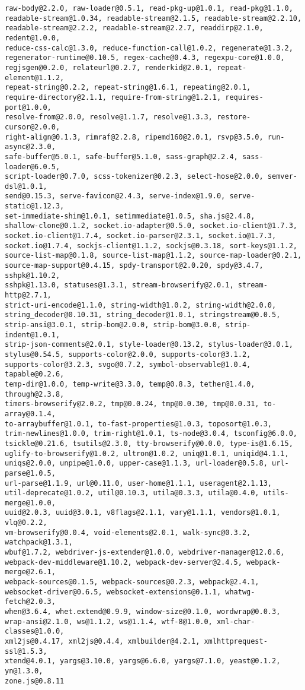 \documentclass[a4paper]{article}
\begin{document}
\begin{verbatim}
raw-body@2.2.0, raw-loader@0.5.1, read-pkg-up@1.0.1, read-pkg@1.1.0,
readable-stream@1.0.34, readable-stream@2.1.5, readable-stream@2.2.10,
readable-stream@2.2.2, readable-stream@2.2.7, readdirp@2.1.0, redent@1.0.0,
reduce-css-calc@1.3.0, reduce-function-call@1.0.2, regenerate@1.3.2,
regenerator-runtime@0.10.5, regex-cache@0.4.3, regexpu-core@1.0.0,
regjsgen@0.2.0, relateurl@0.2.7, renderkid@2.0.1, repeat-element@1.1.2,
repeat-string@0.2.2, repeat-string@1.6.1, repeating@2.0.1,
require-directory@2.1.1, require-from-string@1.2.1, requires-port@1.0.0,
resolve-from@2.0.0, resolve@1.1.7, resolve@1.3.3, restore-cursor@2.0.0,
right-align@0.1.3, rimraf@2.2.8, ripemd160@2.0.1, rsvp@3.5.0, run-async@2.3.0,
safe-buffer@5.0.1, safe-buffer@5.1.0, sass-graph@2.2.4, sass-loader@6.0.5,
script-loader@0.7.0, scss-tokenizer@0.2.3, select-hose@2.0.0, semver-dsl@1.0.1,
send@0.15.3, serve-favicon@2.4.3, serve-index@1.9.0, serve-static@1.12.3,
set-immediate-shim@1.0.1, setimmediate@1.0.5, sha.js@2.4.8,
shallow-clone@0.1.2, socket.io-adapter@0.5.0, socket.io-client@1.7.3,
socket.io-client@1.7.4, socket.io-parser@2.3.1, socket.io@1.7.3,
socket.io@1.7.4, sockjs-client@1.1.2, sockjs@0.3.18, sort-keys@1.1.2,
source-list-map@0.1.8, source-list-map@1.1.2, source-map-loader@0.2.1,
source-map-support@0.4.15, spdy-transport@2.0.20, spdy@3.4.7, sshpk@1.10.2,
sshpk@1.13.0, statuses@1.3.1, stream-browserify@2.0.1, stream-http@2.7.1,
strict-uri-encode@1.1.0, string-width@1.0.2, string-width@2.0.0,
string_decoder@0.10.31, string_decoder@1.0.1, stringstream@0.0.5,
strip-ansi@3.0.1, strip-bom@2.0.0, strip-bom@3.0.0, strip-indent@1.0.1,
strip-json-comments@2.0.1, style-loader@0.13.2, stylus-loader@3.0.1,
stylus@0.54.5, supports-color@2.0.0, supports-color@3.1.2,
supports-color@3.2.3, svgo@0.7.2, symbol-observable@1.0.4, tapable@0.2.6,
temp-dir@1.0.0, temp-write@3.3.0, temp@0.8.3, tether@1.4.0, through@2.3.8,
timers-browserify@2.0.2, tmp@0.0.24, tmp@0.0.30, tmp@0.0.31, to-array@0.1.4,
to-arraybuffer@1.0.1, to-fast-properties@1.0.3, toposort@1.0.3,
trim-newlines@1.0.0, trim-right@1.0.1, ts-node@3.0.4, tsconfig@6.0.0,
tsickle@0.21.6, tsutils@2.3.0, tty-browserify@0.0.0, type-is@1.6.15,
uglify-to-browserify@1.0.2, ultron@1.0.2, uniq@1.0.1, uniqid@4.1.1,
uniqs@2.0.0, unpipe@1.0.0, upper-case@1.1.3, url-loader@0.5.8, url-parse@1.0.5,
url-parse@1.1.9, url@0.11.0, user-home@1.1.1, useragent@2.1.13,
util-deprecate@1.0.2, util@0.10.3, utila@0.3.3, utila@0.4.0, utils-merge@1.0.0,
uuid@2.0.3, uuid@3.0.1, v8flags@2.1.1, vary@1.1.1, vendors@1.0.1, vlq@0.2.2,
vm-browserify@0.0.4, void-elements@2.0.1, walk-sync@0.3.2, watchpack@1.3.1,
wbuf@1.7.2, webdriver-js-extender@1.0.0, webdriver-manager@12.0.6,
webpack-dev-middleware@1.10.2, webpack-dev-server@2.4.5, webpack-merge@2.6.1,
webpack-sources@0.1.5, webpack-sources@0.2.3, webpack@2.4.1,
websocket-driver@0.6.5, websocket-extensions@0.1.1, whatwg-fetch@2.0.3,
when@3.6.4, whet.extend@0.9.9, window-size@0.1.0, wordwrap@0.0.3,
wrap-ansi@2.1.0, ws@1.1.2, ws@1.1.4, wtf-8@1.0.0, xml-char-classes@1.0.0,
xml2js@0.4.17, xml2js@0.4.4, xmlbuilder@4.2.1, xmlhttprequest-ssl@1.5.3,
xtend@4.0.1, yargs@3.10.0, yargs@6.6.0, yargs@7.1.0, yeast@0.1.2, yn@1.3.0,
zone.js@0.8.11


\end{verbatim}
\end{document}
